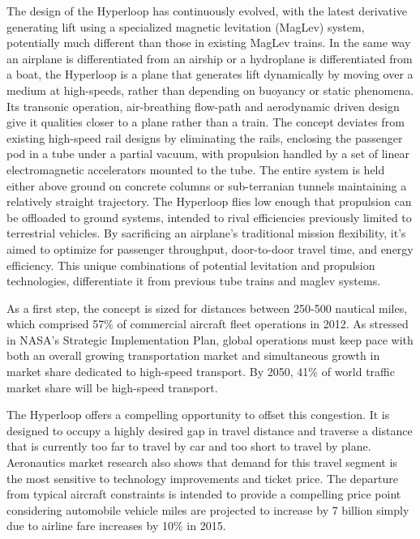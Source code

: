 	The design of the Hyperloop has continuously evolved, with the latest derivative
	generating lift using a specialized magnetic levitation (MagLev) system,
	potentially much different than those in existing MagLev trains.
	In the same way an airplane is differentiated from an airship or a hydroplane is differentiated from
	a boat, the Hyperloop is a plane that generates lift dynamically
	by moving over a medium at high-speeds,
	rather than depending on buoyancy or static phenomena.
	Its transonic operation, air-breathing flow-path and aerodynamic
	driven design give it qualities closer to a plane rather than a train.
	The concept deviates from existing high-speed rail designs by eliminating
	the rails, enclosing the passenger pod in a tube under a partial vacuum,
	with propulsion handled by a set of linear electromagnetic accelerators
	mounted to the tube. The entire system is held either above ground on concrete
	columns or sub-terranian tunnels maintaining a relatively straight trajectory.
	The Hyperloop flies low enough that propulsion can be offloaded to ground systems,
	intended to rival efficiencies previously limited to terrestrial vehicles.
	By sacrificing an airplane's traditional mission flexibility,
	it's aimed to optimize for passenger throughput, door-to-door travel time,
	and energy efficiency.
	This unique combinations of potential levitation and propulsion technologies,
	differentiate it from previous tube trains and maglev systems.

	As a first step, the concept is sized for distances between 250-500 nautical miles,
	which comprised 57\% of commercial aircraft fleet operations in 2012. As stressed in NASA's
	Strategic Implementation Plan, global operations must keep pace with both an overall growing
	transportation market and simultaneous growth in market share dedicated to high-speed transport.
	By 2050, 41\% of world traffic market share will be high-speed transport. \cite{Schafer}

	The Hyperloop offers a compelling opportunity to offset this congestion.
	It is designed to occupy a highly desired gap in travel distance and traverse a distance
	that is currently too far to travel by car and too short to travel by plane. Aeronautics market
	research \cite{H. Baik} also shows that demand for this travel segment is the most sensitive to
	technology improvements and ticket price. The departure from typical aircraft constraints
	is intended to provide a compelling price point considering automobile vehicle miles are
	projected to increase by 7 billion simply due to airline
	fare increases by 10\% in 2015.

